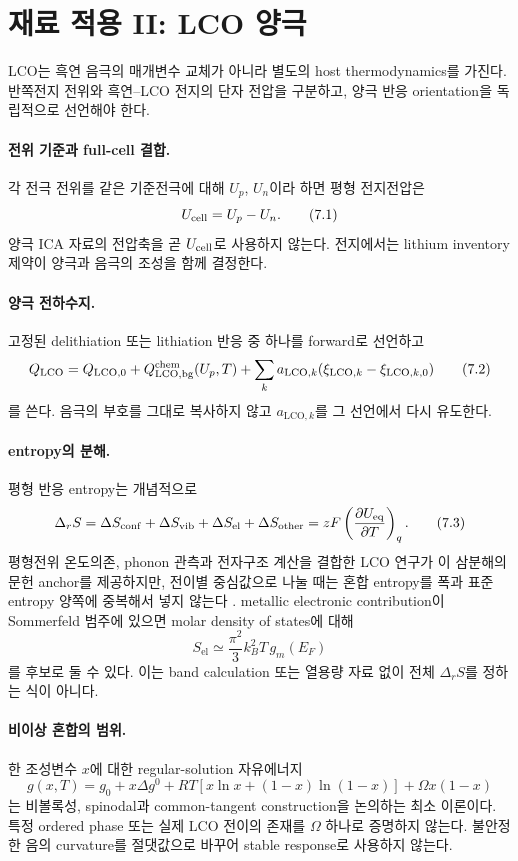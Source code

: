 \section{재료 적용 II: LCO 양극}\label{MAT-LCO-000}

LCO는 흑연 음극의 매개변수 교체가 아니라 별도의 host
thermodynamics를 가진다. 반쪽전지 전위와 흑연--LCO 전지의 단자
전압을 구분하고, 양극 반응 orientation을 독립적으로 선언해야 한다.

\paragraph{ 전위 기준과 full-cell 결합.}
각 전극 전위를 같은 기준전극에 대해 $U_p$, $U_n$이라 하면
평형 전지전압은
\[
 U_{\mathrm{cell}}=U_p-U_n .
 \tag{7.1}
\]
양극 ICA 자료의 전압축을 곧 $U_{\mathrm{cell}}$로 사용하지 않는다.
전지에서는 lithium inventory 제약이 양극과 음극의 조성을 함께
결정한다.

\paragraph{ 양극 전하수지.}
고정된 delithiation 또는 lithiation 반응 중 하나를 forward로
선언하고
\[
 Q_\mathrm{LCO}
 =Q_{\mathrm{LCO},0}+Q_{\mathrm{LCO},\mathrm{bg}}^{\mathrm{chem}}(U_p,T)
 +\sum_k a_{\mathrm{LCO},k}
 (\xi_{\mathrm{LCO},k}-\xi_{\mathrm{LCO},k,0})
 \tag{7.2}
\]
를 쓴다. 음극의 부호를 그대로 복사하지 않고 $a_{\mathrm{LCO},k}$를
그 선언에서 다시 유도한다.

\paragraph{ entropy의 분해.}
평형 반응 entropy는 개념적으로
\[
 \Delta_rS
 =\Delta S_\mathrm{conf}
 +\Delta S_\mathrm{vib}
 +\Delta S_\mathrm{el}
 +\Delta S_\mathrm{other}
 =zF\left(\frac{\partial U_{\mathrm{eq}}}{\partial T}\right)_q .
 \tag{7.3}
\]
평형전위 온도의존, phonon 관측과 전자구조 계산을 결합한 LCO
연구가 이 삼분해의 문헌 anchor를 제공하지만, 전이별 중심값으로
나눌 때는 혼합 entropy를 폭과 표준 entropy 양쪽에 중복해서 넣지
않는다 \cite{reynierLCO}.
metallic electronic contribution이 Sommerfeld 범주에 있으면
molar density of states에 대해
\[
 S_\mathrm{el}\simeq
 \frac{\pi^2}{3}k_B^2T\,g_m(E_F)
 \tag{7.4}
\]
를 후보로 둘 수 있다. 이는 band calculation 또는 열용량 자료
없이 전체 $\Delta_rS$를 정하는 식이 아니다.

\paragraph{ 비이상 혼합의 범위.}
한 조성변수 $x$에 대한 regular-solution 자유에너지
\[
 g(x,T)=g_0+x\Delta g^0
 +RT[x\ln x+(1-x)\ln(1-x)]
 +\Omega x(1-x)
 \tag{7.5}
\]
는 비볼록성, spinodal과 common-tangent construction을 논의하는
최소 이론이다. 특정 ordered phase 또는 실제 LCO 전이의 존재를
$\Omega$ 하나로 증명하지 않는다. 불안정한 음의 curvature를
절댓값으로 바꾸어 stable response로 사용하지 않는다.

